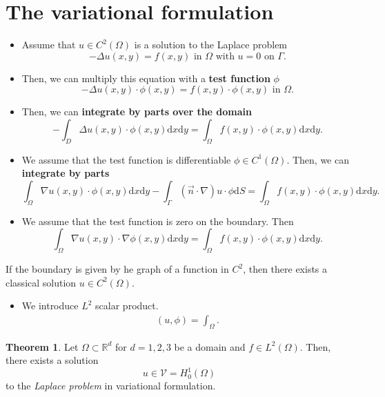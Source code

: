 \documentclass[
	a4paper,
	11pt,
	oneside
]{scrreprt}
\theoremstyle{definition}
\newtheorem{theorem}{Theorem}
\begin{document}
\section{The variational formulation}

\begin{itemize}
	\item Assume that $u\in C^{2}(\Omega)$ is a solution to the Laplace problem \[-\Delta u\left(x,y\right)=f\left(x,y\right)\text{ in }\Omega\text{ with }u=0\text{ on }\Gamma.\]
	\item Then, we can multiply this equation with a \textbf{test function} $\phi$ \[ -\Delta u\left(x,y\right)\cdot\phi\left(x,y\right)=f\left(x,y\right)\cdot\phi\left(x,y\right)\text{ in }\Omega. \]
	\item Then, we can \textbf{integrate by parts over the domain} \[ -\int_{D}\Delta u\left(x,y\right)\cdot\phi\left(x,y\right)\mathrm{d}x\mathrm{d}y=\int_{\Omega}f\left(x,y\right)\cdot\phi\left(x,y\right)\mathrm{d}x\mathrm{d}y. \]
	\item We assume that the test function is differentiable $\phi\in C^{1}(\Omega)$. Then, we can \textbf{integrate by parts} \[\int_{\Omega}\nabla u\left(x,y\right)\cdot\phi\left(x,y\right)\mathrm{d}x\mathrm{d}y-\int_{\Gamma}\left(\vec{n}\cdot\nabla\right)u\cdot\phi\mathrm{d}S=\int_{\Omega}f\left(x,y\right)\cdot\phi\left(x,y\right)\mathrm{d}x\mathrm{d}y. \]
	\item We assume that the test function is zero on the boundary. Then \[ \int_{\Omega}\nabla u\left(x,y\right)\cdot\nabla\phi\left(x,y\right)\mathrm{d}x\mathrm{d}y=\int_{\Omega}f\left(x,y\right)\cdot\phi\left(x,y\right)\mathrm{d}x\mathrm{d}y. \]
\end{itemize}

If the boundary is given by he graph of a function in $C^{2}$, then there exists a classical solution $u\in C^{2}\left(\Omega\right)$.
\begin{itemize}
	\item We introduce $L^{2}$ scalar product.
	\begin{align*}
	\left(u,\phi\right)=\int_{\Omega}.
	\end{align*}
\end{itemize}

\begin{theorem}
Let $\Omega\subset\mathbb{R}^{d}$ for $d=1,2,3$ be a domain and $f\in L^{2}\left(\Omega\right)$. Then, there exists a solution \[ u\in\mathcal{V}=H^{1}_{0}\left(\Omega\right) \] to the \textit{Laplace problem} in variational formulation.
\end{theorem}
\end{document}
